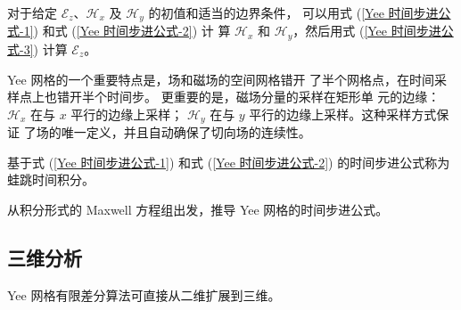 \par 对于给定 $\mathscr{E}_z$、$\mathscr{H}_x$ 
及 $\mathscr{H}_y$ 的初值和适当的边界条件，
可以用式 (\ref{Yee 时间步进公式-1}) 和式 (\ref{Yee 时间步进公式-2}) 计
算 $\mathscr{H}_x$ 
和 $\mathscr{H}_y$，然后用式 (\ref{Yee 时间步进公式-3}) 计算
$\mathscr{E}_z$。

\begin{note}
    Yee 网格的一个重要特点是，场和磁场的空间网格错开
    了半个网格点，在时间采样点上也错开半个时间步。
    更重要的是，磁场分量的采样在矩形单
    元的边缘：$\mathscr{H}_x$ 在与 $x$ 平行的边缘上采样；
    $\mathscr{H}_y$ 在与 $y$ 平行的边缘上采样。这种采样方式保证
    了场的唯一定义，并且自动确保了切向场的连续性。
\end{note}

\par 基于式 (\ref{Yee 时间步进公式-1})
和式 (\ref{Yee 时间步进公式-2}) 的时间步进公式称为蛙跳时间积分。

\begin{exercise}
    从积分形式的 Maxwell 方程组出发，推导 Yee 网格的时间步进公式。
\end{exercise}

\subsection{三维分析}

\par Yee 网格有限差分算法可直接从二维扩展到三维。

